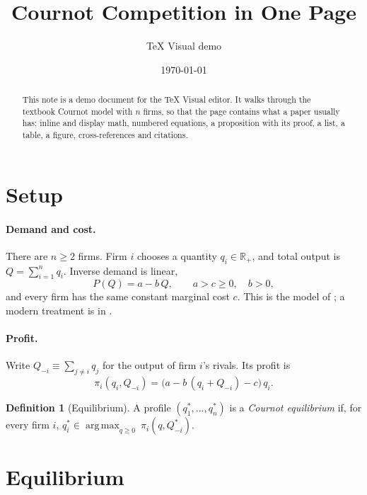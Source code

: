 \documentclass[11pt]{article}
\title{Cournot Competition in One Page}
\author{TeX Visual demo}
\date{\today}
\theoremstyle{definition}
\newtheorem{definition}{Definition}
\newcommand{\R}{\mathbb{R}}
\newcommand{\qstar}{q^{*}}
\DeclareMathOperator*{\argmax}{arg\,max}
\begin{document}
\maketitle

\begin{abstract}
\noindent This note is a demo document for the TeX Visual editor. It walks through the textbook Cournot model with $n$ firms, so that the page contains what a paper usually has: inline and display math, numbered equations, a proposition with its proof, a list, a table, a figure, cross-references and citations.
\end{abstract}

\section{Setup}

\paragraph{Demand and cost.} There are $n\ge 2$ firms. Firm $i$ chooses a quantity $q_i\in\R_{+}$, and total output is $Q=\sum_{i=1}^{n} q_i$. Inverse demand is linear,
\begin{equation}\label{eq:demand}
  P(Q) = a - b\,Q, \qquad a > c \ge 0,\quad b>0,
\end{equation}
and every firm has the same constant marginal cost $c$. This is the model of \citet{cournot1838}; a modern treatment is in \citet{tirole1988}.

\paragraph{Profit.} Write $Q_{-i}\equiv\sum_{j\ne i} q_j$ for the output of firm $i$'s rivals. Its profit is
\begin{equation}\label{eq:profit}
  \pi_i(q_i, Q_{-i}) = \bigl(a - b\,(q_i + Q_{-i}) - c\bigr)\,q_i .
\end{equation}

\begin{definition}[Equilibrium]\label{def:eq}
A profile $(\qstar_1,\dots,\qstar_n)$ is a \emph{Cournot equilibrium} if, for every firm $i$, $\qstar_i \in \argmax_{q\ge 0}\ \pi_i(q, Q^{*}_{-i})$.
\end{definition}

\section{Equilibrium}
\end{document}
